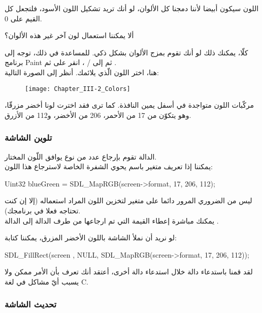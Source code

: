 اللون سيكون أبيضا لأننا دمجنا كل الألوان، لو أنك تريد تشكيل اللون الأسود، فلتجعل كل القيم على 0.

\begin{question}
ألا يمكننا استعمال لون آخر غير هذه الألوان؟
\end{question}

كلّا، يمكنك ذلك لو أنك تقوم بمزج الألوان بشكل ذكي. للمساعدة في ذلك، توجه إلى برنامج
\textenglish{Paint}
ثم إلى
 / ،
انقر على
ثم
.\\
هنا، اختر اللون الّذي يلائمك. أنظر إلى الصورة التالية:

\begin{figure}[H]
	\centering
	\texttt{[image: Chapter\_III-2\_Colors]}
\end{figure}

مركّبات اللون متواجدة في أسفل يمين النافذة. كما ترى فقد اخترت لونا أخضر مزرقّا، وهو يتكوّن من 17 من الأحمر، 206 من الأخضر، و112 من الأزرق.
\subsubsection{تلوين الشاشة}

الدالة
تقوم بإرجاع عدد من نوع
يوافق اللّون المختار.\\
يمكننا إذا تعريف متغير باسم
يحوي الشفرة الخاصة لاسترجاع هذا اللون:

\begin{Csource}
Uint32 blueGreen = SDL_MapRGB(screen->format, 17, 206, 112);
\end{Csource}

ليس من الضروري المرور دائما على متغير لتخزين اللون المراد استعماله (إلا إن كنت تحتاجه فعلا في برنامجك).\\
يمكنك مباشرة إعطاء القيمة التي تم ارجاعها من طرف الدالة
إلى الدالة
.

لو نريد أن نملأ الشاشة باللون الأخضر المزرق، يمكننا كتابة:

\begin{Csource}
SDL_FillRect(screen , NULL, SDL_MapRGB(screen->format, 17, 206, 112));
\end{Csource}

لقد قمنا باستدعاء دالة خلال استدعاء دالة أخرى، أعتقد أنك تعرف بأن الأمر ممكن ولا يسبب أيّ مشاكل في لغة
\textenglish{C}.

\subsubsection{تحديث الشاشة}

